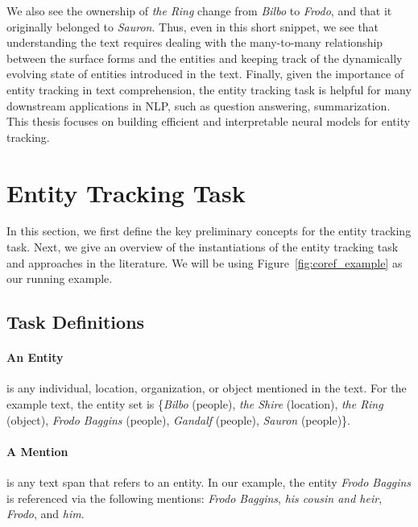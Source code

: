 \documentclass[12pt]{thesis-umich}[thesis]
\begin{document}
We also see the ownership of \textit{the Ring} change from \textit{Bilbo} to \textit{Frodo}, and that it originally belonged to \textit{Sauron}. 
Thus, even in this short snippet, we see that understanding the text requires dealing with the many-to-many relationship between the surface forms and the entities and keeping track of the dynamically evolving state of entities introduced in the text.  
Finally, given the importance of entity tracking in text comprehension, the entity tracking task is helpful for many downstream applications in NLP, such as question answering, summarization.
This thesis focuses on building efficient and interpretable neural models for entity tracking. 













\section{Entity Tracking Task}
\label{sec:entity_tracking_def}
In this section, we first define the key preliminary concepts for the entity tracking task. Next, we give an overview of the instantiations of the entity tracking task and approaches in the literature. We will be using Figure~\ref{fig:coref_example} as our running example. 



\subsection{Task Definitions}

\paragraph{An Entity} is any individual, location, organization, or object mentioned in the text. For the example text, the entity set is \{\emph{Bilbo} (people), \emph{the Shire} (location), \emph{the Ring} (object), \emph{Frodo Baggins} (people), \emph{Gandalf} (people), \emph{Sauron} (people)\}.

\paragraph{A Mention} is any text span that refers to an entity. In our example, the entity \emph{Frodo Baggins} is referenced via the following mentions:  \emph{Frodo Baggins}, \textit{his cousin and heir}, \textit{Frodo}, and \textit{him}. 
\end{document}
